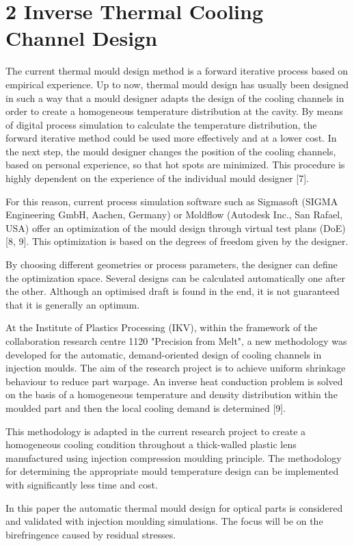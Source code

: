\documentclass[10pt]{article}
\begin{document}
\section*{2 Inverse Thermal Cooling Channel Design}
The current thermal mould design method is a forward iterative process based on empirical experience. Up to now, thermal mould design has usually been designed in such a way that a mould designer adapts the design of the cooling channels in order to create a homogeneous temperature distribution at the cavity. By means of digital process simulation to calculate the temperature distribution, the forward iterative method could be used more effectively and at a lower cost. In the next step, the mould designer changes the position of the cooling channels, based on personal experience, so that hot spots are minimized. This procedure is highly dependent on the experience of the individual mould designer [7].

For this reason, current process simulation software such as Sigmasoft (SIGMA Engineering GmbH, Aachen, Germany) or Moldflow (Autodesk Inc., San Rafael, USA) offer an optimization of the mould design through virtual test plans (DoE) [8, 9]. This optimization is based on the degrees of freedom given by the designer.

By choosing different geometries or process parameters, the designer can define the optimization space. Several designs can be calculated automatically one after the other. Although an optimised draft is found in the end, it is not guaranteed that it is generally an optimum.

At the Institute of Plastics Processing (IKV), within the framework of the collaboration research centre 1120 "Precision from Melt", a new methodology was developed for the automatic, demand-oriented design of cooling channels in injection moulds. The aim of the research project is to achieve uniform shrinkage behaviour to reduce part warpage. An inverse heat conduction problem is solved on the basis of a homogeneous temperature and density distribution within the moulded part and then the local cooling demand is determined [9].

This methodology is adapted in the current research project to create a homogeneous cooling condition throughout a thick-walled plastic lens manufactured using injection compression moulding principle. The methodology for determining the appropriate mould temperature design can be implemented with significantly less time and cost.

In this paper the automatic thermal mould design for optical parts is considered and validated with injection moulding simulations. The focus will be on the birefringence caused by residual stresses.
\end{document}
